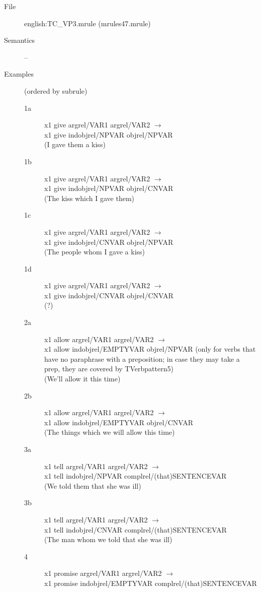 \begin{description}
\begin{description}
\item[File] english:TC\_VP3.mrule (mrules47.mrule)
\item[Semantics] --
\item[Examples] (ordered by subrule)
  \begin{description}
  \item[1a] x1 give argrel/VAR1 argrel/VAR2 $\rightarrow$ \\
x1 give indobjrel/NPVAR objrel/NPVAR \\
(I gave them a kiss)
  \item[1b] x1 give argrel/VAR1 argrel/VAR2 $\rightarrow$ \\
x1 give indobjrel/NPVAR objrel/CNVAR \\
(The kiss which I gave them)
  \item[1c] x1 give argrel/VAR1 argrel/VAR2 $\rightarrow$ \\
x1 give indobjrel/CNVAR objrel/NPVAR \\
(The people whom I gave a kiss)
  \item[1d] x1 give argrel/VAR1 argrel/VAR2 $\rightarrow$ \\
x1 give indobjrel/CNVAR objrel/CNVAR \\
(?)
  \item[2a] x1 allow argrel/VAR1 argrel/VAR2 $\rightarrow$ \\
x1 allow
indobjrel/EMPTYVAR objrel/NPVAR (only for verbs that have no paraphrase with a 
preposition; in case they may take a prep, they are covered by 
TVerbpattern5) \\
(We'll allow it this time)
  \item[2b] x1 allow argrel/VAR1 argrel/VAR2 $\rightarrow$ \\
x1 allow indobjrel/EMPTYVAR objrel/CNVAR \\
(The things which we will allow this time)
  \item[3a] x1 tell argrel/VAR1 argrel/VAR2 $\rightarrow$ \\
x1 tell indobjrel/NPVAR complrel/(that)SENTENCEVAR \\
(We told them that she was ill)
  \item[3b] x1 tell argrel/VAR1 argrel/VAR2 $\rightarrow$ \\
x1 tell indobjrel/CNVAR complrel/(that)SENTENCEVAR \\
(The man whom we told that she was ill)
  \item[4] x1 promise argrel/VAR1 argrel/VAR2 $\rightarrow$ \\
x1 promise indobjrel/EMPTYVAR complrel/(that)SENTENCEVAR \\

\end{description}
\end{description}
\end{description}

